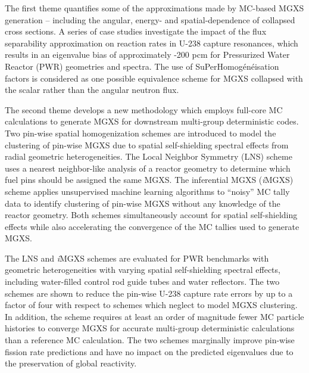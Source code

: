 \begin{abstractpage}
The first theme quantifies some of the approximations made by MC-based MGXS generation -- including the angular, energy- and spatial-dependence of collapsed cross sections. A series of case studies investigate the impact of the flux separability approximation on reaction rates in U-238 capture resonances, which results in an eigenvalue bias of approximately -200 pcm for Pressurized Water Reactor (PWR) geometries and spectra. The use of SuPerHomog\'{e}n\'{e}isation factors is considered as one possible equivalence scheme for MGXS collapsed with the scalar rather than the angular neutron flux.

The second theme develops a new methodology which employs full-core MC calculations to generate MGXS for downstream multi-group deterministic codes. Two pin-wise spatial homogenization schemes are introduced to model the clustering of pin-wise MGXS due to spatial self-shielding spectral effects from radial geometric heterogeneities. The Local Neighbor Symmetry (LNS) scheme uses a nearest neighbor-like analysis of a reactor geometry to determine which fuel pins should be assigned the same MGXS. The inferential MGXS (\textit{i}MGXS) scheme applies unsupervised machine learning algorithms to ``noisy'' MC tally data to identify clustering of pin-wise MGXS without any knowledge of the reactor geometry. Both schemes simultaneously account for spatial self-shielding effects while also accelerating the convergence of the MC tallies used to generate MGXS.



The LNS and \textit{i}MGXS schemes are evaluated for PWR benchmarks with geometric heterogeneities with varying spatial self-shielding spectral effects, including water-filled control rod guide tubes and water reflectors. The two schemes are shown to reduce the pin-wise U-238 capture rate errors by up to a factor of four with respect to schemes which neglect to model MGXS clustering. In addition, the scheme requires at least an order of magnitude fewer MC particle histories to converge MGXS for accurate multi-group deterministic calculations than a reference MC calculation. The two schemes marginally improve pin-wise fission rate predictions and have no impact on the predicted eigenvalues due to the preservation of global reactivity.


\end{abstractpage}
